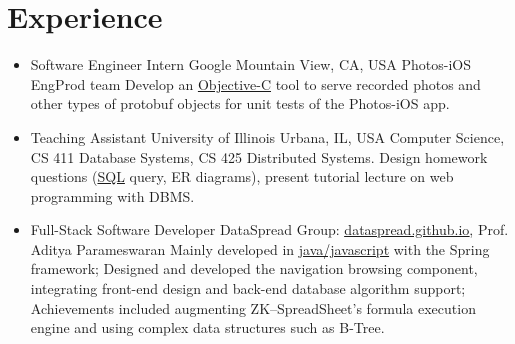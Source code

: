 \documentclass[11pt,a4paper,sans]{moderncv}        %
\begin{document}
\section{Experience}
\begin{itemize}
	
	\item{
	      {Software Engineer Intern}
	      {Google}
	      {Mountain View, CA, USA}
	      {Photos-iOS EngProd team}
	      {Develop an \underline{Objective-C} tool to serve recorded photos and other types of protobuf objects for unit tests of the Photos-iOS app.}
	      }
	      
	
	\item{
	      {Teaching Assistant}
	      {University of Illinois}
	      {Urbana, IL, USA}
	      {Computer Science, CS 411 Database Systems, CS 425 Distributed Systems.}
	      {Design homework questions (\underline{SQL} query, ER diagrams), present tutorial lecture on web programming with DBMS.}
	      }
	      
	\item{
	      {Full-Stack Software Developer}
	      {\vspace{-10pt}}
	      {}
	      {DataSpread Group:
		      \href{https://dataspread.github.io}{\underline{dataspread.github.io}}, Prof. Aditya Parameswaran}
	      {
		      Mainly developed in \underline{java/javascript} with the Spring framework;
		      Designed and developed the navigation browsing component, integrating front-end design and back-end database algorithm support;
		      Achievements included augmenting ZK--SpreadSheet's formula execution engine and using complex data structures such as B-Tree.}
	      }
	      
	      

\end{itemize}
\end{document}
